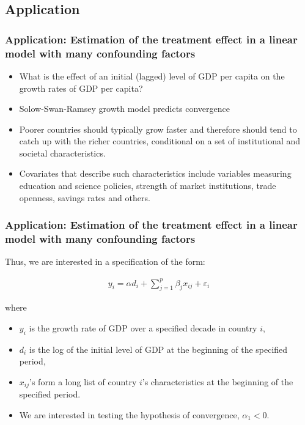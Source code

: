 \documentclass[
  shownotes,
  xcolor={svgnames},
  hyperref={colorlinks,citecolor=DarkBlue,linkcolor=DarkRed,urlcolor=DarkBlue}
  , aspectratio=169]{beamer}
\begin{document}
\subsection{Application}
\begin{frame}[fragile]
\frametitle{Application: Estimation of the treatment effect in a linear model with many confounding factors}

\begin{itemize}
\item What is the effect of an initial (lagged) level of GDP per capita on the growth rates of GDP per capita?
\medskip
\item Solow-Swan-Ramsey growth model predicts convergence
\medskip
\item Poorer countries should typically grow faster and therefore should tend to catch up with the richer countries, conditional on a set of institutional and societal characteristics. 
\medskip
\item Covariates that describe such characteristics include variables measuring education and science policies, strength of market institutions, trade openness, savings rates and others.
\end{itemize}

\end{frame}
\begin{frame}[fragile]
\frametitle{Application: Estimation of the treatment effect in a linear model with many confounding factors}


Thus, we are interested in a specification of the form:

\begin{align}
y_i = \alpha d_i+ \sum_{j=1}^p \beta_j x_{ij} + \varepsilon_i
\end{align}

where
\begin{itemize}
\item  \(y_i\) is the growth rate of GDP over a specified decade in country \(i\), 
\item \(d_i\) is the log of the initial level of GDP at the beginning of the specified period, 
\item \(x_{ij}\)'s form a long list of country \(i\)'s characteristics at the beginning of the specified period. 
\item We are interested in testing the hypothesis of convergence,  \(\alpha_1 < 0\).
\end{itemize}


 

\end{frame}
\end{document}
